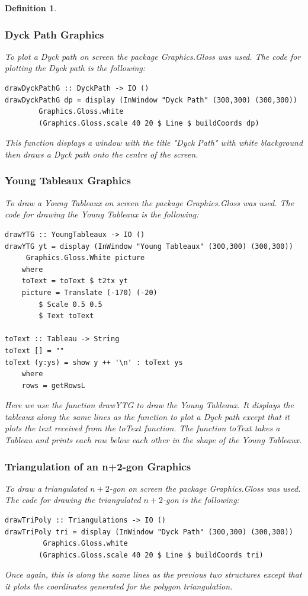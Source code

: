 \documentclass[12pt]{article}
\newtheorem{definition}{Definition}
\begin{document}
\begin{definition}
\subsubsection{Dyck Path Graphics}
To plot a Dyck path on screen the package Graphics.Gloss was used. \cite{Gloss} The code for plotting the Dyck path is the following:
\begin{lstlisting}
drawDyckPathG :: DyckPath -> IO ()
drawDyckPathG dp = display (InWindow "Dyck Path" (300,300) (300,300)) 
		Graphics.Gloss.white
		(Graphics.Gloss.scale 40 20 $ Line $ buildCoords dp)
\end{lstlisting}
This function displays a window with the title "Dyck Path" with white blackground then draws a Dyck path onto the centre of the screen.

\subsubsection{Young Tableaux Graphics}
 To draw a Young Tableaux on screen the package Graphics.Gloss was used. \cite{Gloss} The code for drawing the Young Tableaux is the following:
\begin{lstlisting}
drawYTG :: YoungTableaux -> IO ()
drawYTG yt = display (InWindow "Young Tableaux" (300,300) (300,300))
	 Graphics.Gloss.White picture 
	where
	toText = toText $ t2tx yt
	picture = Translate (-170) (-20) 
		$ Scale 0.5 0.5 
		$ Text toText	

toText :: Tableau -> String
toText [] = ""
toText (y:ys) = show y ++ '\n' : toText ys 
	where
	rows = getRowsL
\end{lstlisting}
Here we use the function {\it drawYTG} to draw the Young Tableaux. It displays the tableaux along the same lines as the function to plot a Dyck path except that it plots the text received from the {\it toText} function. The function {\it toText} takes a Tableau and prints each row below each other in the shape of the Young Tableaux.

\subsubsection{Triangulation of an n+2-gon Graphics}
To draw a triangulated $n+2$-gon on screen the package Graphics.Gloss was used. \cite{Gloss} The code for drawing the triangulated $n+2$-gon is the following:
\begin{lstlisting}
drawTriPoly :: Triangulations -> IO ()
drawTriPoly tri = display (InWindow "Dyck Path" (300,300) (300,300))
		 Graphics.Gloss.white 
		(Graphics.Gloss.scale 40 20 $ Line $ buildCoords tri)
\end{lstlisting}
Once again, this is along the same lines as the previous two structures except that it plots the coordinates generated for the polygon triangulation.


\end{definition}
\end{document}
